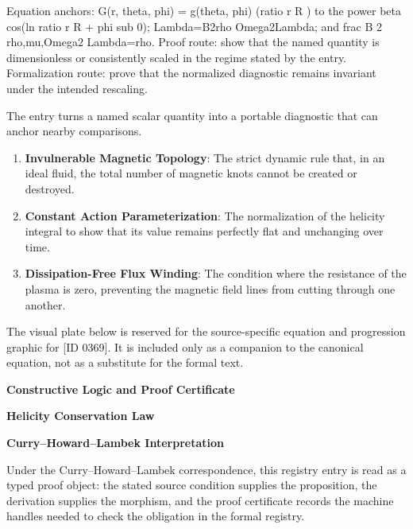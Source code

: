 Equation anchors: G(r, theta, phi) = g(theta, phi) (ratio r R ) to the power beta cos(ln ratio r R + phi sub 0); Lambda=B2rho Omega2Lambda; and frac B 2 rho,mu,Omega2 Lambda=rho. Proof route: show that the named quantity is dimensionless or consistently scaled in the regime stated by the entry. Formalization route: prove that the normalized diagnostic remains invariant under the intended rescaling.

The entry turns a named scalar quantity into a portable diagnostic that can anchor nearby comparisons.
\endgroup

\begin{enumerate}[leftmargin=1.6em,itemsep=6pt,topsep=4pt]
\item \textbf{Invulnerable Magnetic Topology}: The strict dynamic rule that, in an ideal fluid, the total number of magnetic knots cannot be created or destroyed.
\item \textbf{Constant Action Parameterization}: The normalization of the helicity integral to show that its value remains perfectly flat and unchanging over time.
\item \textbf{Dissipation-Free Flux Winding}: The condition where the resistance of the plasma is zero, preventing the magnetic field lines from cutting through one another.
\end{enumerate}

\begingroup\footnotesize\sloppy
The visual plate below is reserved for the source-specific equation and progression graphic for [ID 0369]. It is included only as a companion to the canonical equation, not as a substitute for the formal text.
\par\endgroup
\ifTZPDarkEdition
{}
\fi

\clearpage
\begingroup\tzpsupportsetup
\noindent\textbf{\fontsize{10.8pt}{12.8pt}\selectfont [ID 0369] Constructive Logic and Proof Certificate}\par
\noindent\textbf{\fontsize{10pt}{12pt}\selectfont Helicity Conservation Law}\par
\vspace{0.45em}
\begingroup
\footnotesize
\setlength{\parskip}{0.22em}
\setlength{\parindent}{0pt}
\noindent\textbf{Curry--Howard--Lambek Interpretation}\par
Under the Curry--Howard--Lambek correspondence, this registry entry is read as a typed proof
object: the stated source condition supplies the proposition, the derivation supplies the
morphism, and the proof certificate records the machine handles needed to check the obligation
in the formal registry.

